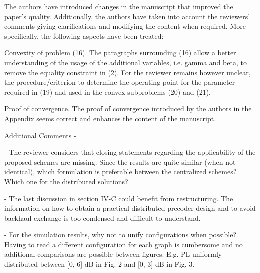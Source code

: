 The authors have introduced changes in the manuscript that improved the paper's quality. Additionally, the authors have taken into account the reviewers' comments giving clarifications and modifying the content when required. More specifically, the following aspects have been treated:

\vspace{0.1in}

\begin{enumerate}
 Convexity of problem (16). The paragraphs surrounding (16) allow a better understanding of the usage of the additional variables, i.e. gamma and beta, to remove the equality constraint in (2). For the reviewer remains however unclear, the procedure/criterion to determine the operating point for the parameter \eqn{\tilde{\beta}} required in (19) and used in the convex subproblems (20) and (21).

\resp \review{
	}

 Proof of convergence. The proof of convergence introduced by the authors in the Appendix seems correct and enhances the content of the manuscript.

\resp \review{}

Additional Comments - 

\begin{enumerate}
	
	 - {The reviewer considers that closing statements regarding the applicability of the proposed schemes are missing. Since the results are quite similar (when not identical), which formulation is preferable between the centralized schemes? Which one for the distributed solutions?}
	
	\resp \review{}
	
	 - {The last discussion in section IV-C could benefit from restructuring. The information on how to obtain a practical distributed precoder design and to avoid backhaul exchange is too condensed and difficult to understand.}
	
	\resp \review{}
	
	 - {For the simulation results, why not to unify configurations when possible? Having to read a different configuration for each graph is cumbersome and no additional comparisons are possible between figures. E.g. PL uniformly distributed between [0,-6] dB in Fig. 2 and [0,-3] dB in Fig. 3.}
	

\end{enumerate}
\end{enumerate}

